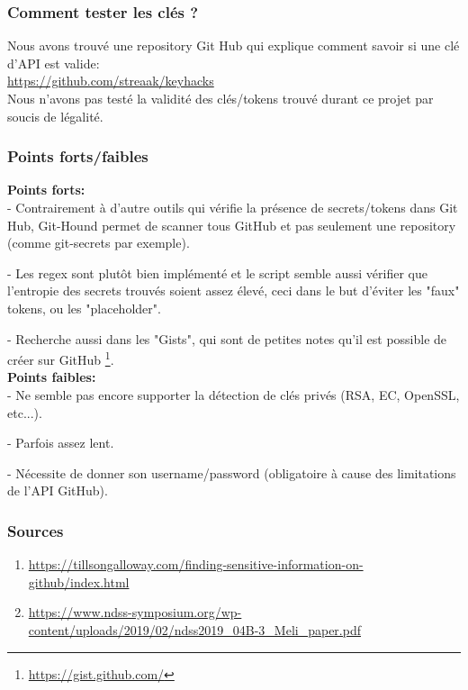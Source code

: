 \subsubsection{Comment tester les clés ?}

Nous avons trouvé une repository Git Hub qui explique comment savoir si une clé d'API est valide:
\\

\url{https://github.com/streaak/keyhacks} \\

Nous n'avons pas testé la validité des clés/tokens trouvé durant ce projet par soucis de légalité.

\subsubsection{Points forts/faibles}

{\bfseries Points forts:} \\

- Contrairement à d'autre outils qui vérifie la présence de secrets/tokens dans Git Hub, Git-Hound permet de scanner
tous GitHub et pas seulement une repository (comme git-secrets par exemple).

- Les regex sont plutôt bien implémenté et le script semble aussi vérifier que l'entropie des secrets trouvés
soient assez élevé, ceci dans le but d'éviter les "faux" tokens, ou les "placeholder".

- Recherche aussi dans les "Gists", qui sont de petites notes qu'il est possible de créer sur GitHub \footnote{\url{https://gist.github.com/}}.
\\

{\bfseries Points faibles:} \\

- Ne semble pas encore supporter la détection de clés privés (RSA, EC, OpenSSL, etc...).

- Parfois assez lent.

- Nécessite de donner son username/password (obligatoire à cause des limitations de l'API GitHub).

\subsubsection{Sources}
\begin{enumerate}
  \item \url{https://tillsongalloway.com/finding-sensitive-information-on-github/index.html}
  \item \url{https://www.ndss-symposium.org/wp-content/uploads/2019/02/ndss2019_04B-3_Meli_paper.pdf}
\end{enumerate}